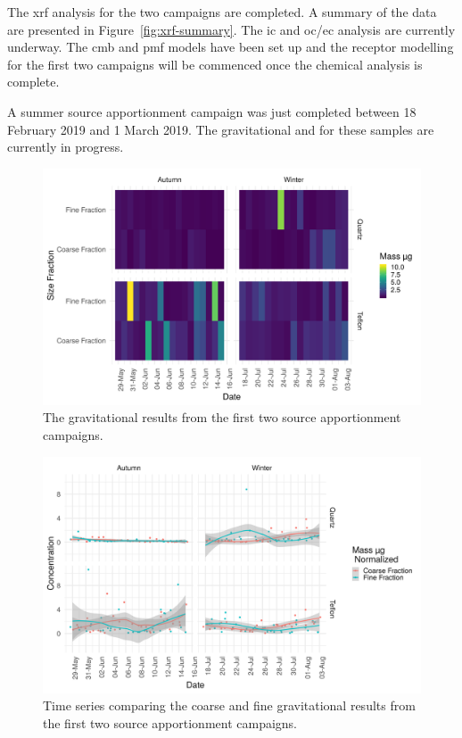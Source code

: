 \documentclass{nwureport}
\begin{document}
The \gls{xrf} analysis for the two campaigns are completed. A summary of the data are presented in Figure~\ref{fig:xrf-summary}. The \gls{ic} and \gls{oc}/\gls{ec} analysis are currently underway. The \gls{cmb} and \gls{pmf} models have been set up and the receptor modelling for the first two campaigns will be commenced once the chemical analysis is complete.

A summer source apportionment campaign was just completed between 18 February 2019 and 1 March 2019. The gravitational and  for these samples are currently in progress.

\begin{figure}[!htb]
    \centering
    \includegraphics[width=\textwidth]{images/Density_FilterDateSizeSeason_mass.png}
    \caption{The gravitational results from the first two source apportionment campaigns.}
    \label{fig:filter-mass}
\end{figure}

\begin{figure}[!htb]
    \centering
    \includegraphics[width=\textwidth]{images/TS_FilterDateSizeSeason_sep_mass.png}
    \caption{Time series comparing the coarse and fine gravitational results from the first two source apportionment campaigns.}
    \label{fig:filter-mass-times}
\end{figure}
\end{document}
